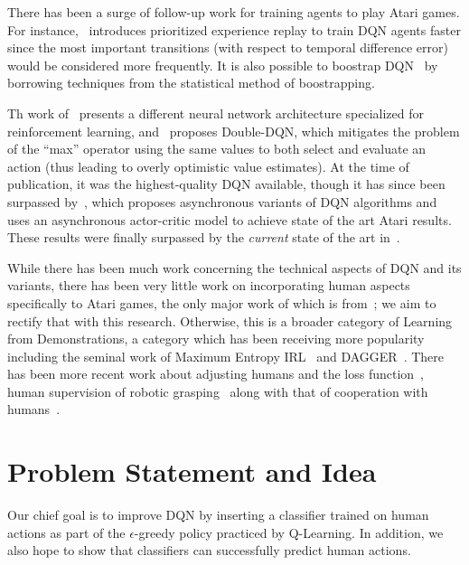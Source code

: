 \documentclass[letterpaper, 10pt, conference]{ieeeconf}
\begin{document}
There has been a surge of follow-up work for training agents to play Atari
games. For instance,~\cite{Schaul2016} introduces prioritized experience replay
to train DQN agents faster since the most important transitions (with respect to
temporal difference error) would be considered more frequently. It is also
possible to boostrap DQN~\cite{NIPS2016_6501} by borrowing techniques from the
statistical method of boostrapping.

Th work of~\cite{DBLP:conf/icml/WangSHHLF16} presents a different neural network
architecture specialized for reinforcement learning,
and~\cite{DBLP:conf/aaai/HasseltGS16} proposes Double-DQN, which mitigates
the problem of the ``max'' operator using the same values to both select and
evaluate an action (thus leading to overly optimistic value estimates). At the
time of publication, it was the highest-quality DQN available, though it has
since been surpassed by~\cite{DBLP:conf/icml/MnihBMGLHSK16}, which proposes
asynchronous variants of DQN algorithms and uses an asynchronous actor-critic
model to achieve state of the art Atari results. These results were finally
surpassed by the \emph{current} state of the art
in~\cite{DBLP:journals/corr/JaderbergMCSLSK16}.

While there has been much work concerning the technical aspects of DQN and its
variants, there has been very little work on incorporating human aspects
specifically to Atari games, the only major work of which is
from~\cite{DBLP:journals/corr/HosuR16}; we aim to rectify that with this
research. Otherwise, this is a broader category of Learning from Demonstrations,
a category which has been receiving more popularity including the seminal work
of Maximum Entropy IRL~\cite{Ziebart_2008_6055} and
DAGGER~\cite{DBLP:journals/jmlr/RossGB11}.  There has been more recent work
about adjusting humans and the loss function~\cite{conf/nips/KimFPP13}, human
supervision of robotic
grasping~\cite{DBLP:journals/corr/LaskeyCLMKJDG16,DBLP:dblp_conf/icra/LaskeySHMPDG16}
along with that of cooperation with humans~\cite{NIPS2016_6420}.



\section{Problem Statement and Idea}\label{sec:idea}

Our chief goal is to improve DQN by inserting a classifier trained on human
actions as part of the $\epsilon$-greedy policy practiced by Q-Learning. In
addition, we also hope to show that classifiers can successfully predict human
actions.
\end{document}
